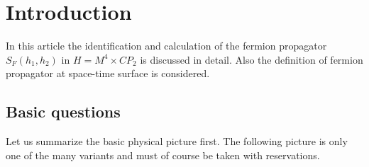 \documentclass[10pt,epsf]{article}
\begin{document}
\section{Introduction}

In this article the  identification and calculation of the  fermion propagator $S_F(h_1,h_2)$ in $H=M^4\times CP_2$ is discussed in detail. Also the definition
of fermion propagator at space-time surface is considered.

\subsection{Basic questions}

Let us summarize the basic physical picture first.  The following picture is only one of the many variants  and must of course be taken with reservations.
\end{document}
